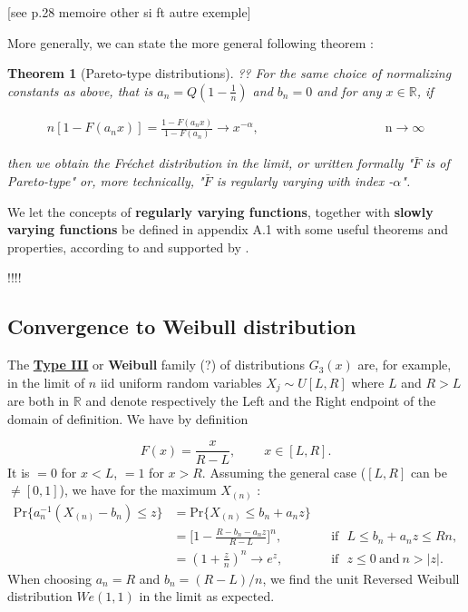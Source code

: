 \documentclass[11pt,a4paper,openany ]{book}
\newtheorem{theorem}{Theorem}[chapter]
\begin{document}
[see p.28 memoire other si ft autre exemple]


More generally, we can state the more general following theorem :
\begin{theorem}[Pareto-type distributions] ?? For the same choice of normalizing constants as above, that is $a_n=Q(1-\frac{1}{n})$ and $b_n=0$ and for any $x\in\mathbb{R}$, if
	
	\begin{equation}
	\begin{aligned}
	n[1-F(a_nx)]= \frac{1-F(a_nx)}{1-F(a_n)}\rightarrow x^{-\alpha} ,&&&&&&&&&&&& \text{ n}\to\infty
	\end{aligned}
	\end{equation}
	
	then we obtain the Fréchet distribution in the limit, or written formally "\emph{$\bar{F}$ is of Pareto-type}" or, more technically, "\emph{$\bar{F}$ is regularly varying with index -$\alpha$}".
\end{theorem}
We let the concepts of \textbf{regularly varying functions}, together with \textbf{slowly varying functions} be defined in appendix A.1 with some useful theorems and properties, according to \citet[pp.51-54]{beirlant_practical_1996} and supported by \citet[pp.49, 77-82]{beirlant_statistics_2006}.

\citet[pp.75]{beirlant_statistics_2006} !!!!

\subsection*{Convergence to Weibull distribution}

The \textbf{\underline{Type III}} or \textbf{Weibull} family (?) of distributions $G_3(x)$ are, for example, in the limit of $n$ iid uniform random variables $X_j\sim U[L,R]$ where $L$ and $R>L$ are both in $\mathbb{R}$  and denote respectively the Left and the Right endpoint of the domain of definition. We have by definition

\begin{equation*}
F(x)=\frac{x}{R-L}, \ \ \ \ \ \ \ \  \ \ x\in [L,R].
\end{equation*}
It is $=0$ for $x<L$,  $=1$ for $x>R$.
Assuming the general case ($[L,R]$ can be $\neq [0,1]$), we have for the maximum $X_{(n)}$
:
\begin{equation*}
\begin{aligned}
\text{Pr}\{a_n^{-1}(X_{(n)}-b_n)\leq z\}
&=\text{Pr}\{X_{(n)}\leq b_n+a_nz\} \\
& = \Big[1-\frac{R-b_n-a_nz}{R-L}\Big]^n, & & \text{if}\ \ \ L\leq b_n+a_nz\leq Rn, \\ 
& = (1+\frac{z}{n})^n\to e^z, & & \text{if} \ \ \  z\leq 0 \ \text{and} \ n>|z|.
\end{aligned}
\end{equation*}
When choosing $a_n=R$ and $b_n=(R-L)/n$, we find the unit Reversed Weibull distribution $We(1,1)$ in the limit as expected.
\newline
\end{document}
